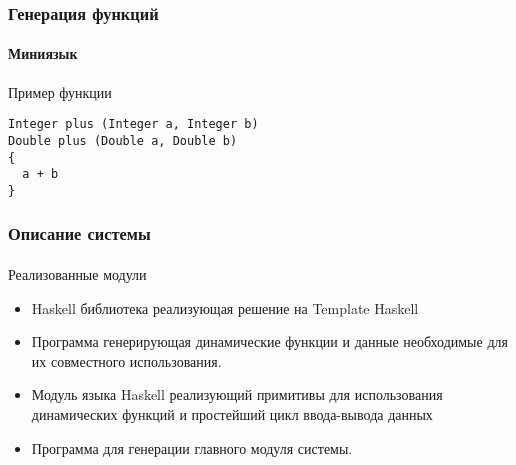 \documentclass[ucs]{beamer}
\begin{document}

\begin{frame}[fragile]
  \frametitle{Генерация функций}
  \framesubtitle{Миниязык}

  \begin{block}{Пример функции}
\begin{verbatim}
Integer plus (Integer a, Integer b)
Double plus (Double a, Double b)
{
  a + b
}
\end{verbatim}
  \end{block}
\end{frame}

\begin{frame}[fragile]
  \frametitle{Описание системы}
  \framesubtitle{}
  
  \begin{block}{Реализованные модули}
    \begin{itemize}
    \item Haskell библиотека реализующая решение на Template Haskell
    \item Программа генерирующая динамические функции и данные
      необходимые для их совместного использования.
    \item Модуль языка Haskell реализующий примитивы для использования
      динамических функций и простейший цикл ввода-вывода данных
    \item Программа для генерации главного модуля системы.
    \end{itemize}
  \end{block}
\end{frame}
\end{document}
